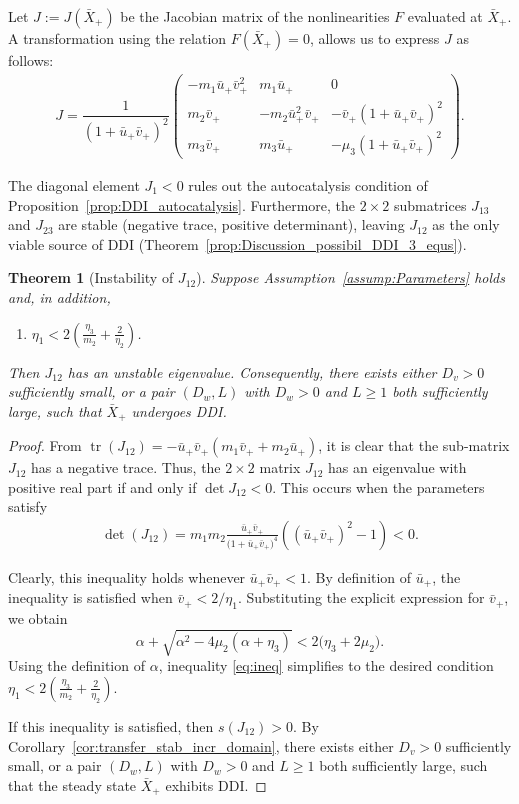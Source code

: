 \documentclass[12pt, a4paper]{amsart}
\numberwithin{equation}{section}
\newcommand{\CSS}{\bar{X}}
\def\me{\mu_3}
\def\be{\begin{equation}}
\def\ee{\end{equation}}
\def\bpm{\begin{pmatrix}}
\def\epm{\end{pmatrix}}
\DeclareMathOperator{\tr}{tr}
\newtheorem{theorem}{\bf Theorem}[section]
\begin{document}
Let $J := J(\CSS_+)$ be the Jacobian matrix of the nonlinearities $F$ evaluated at $\CSS_+$. A transformation using the relation $F(\CSS_+) = 0$, allows us to express $J$ as follows:
\begin{align}    
J 
= \dfrac{1}{(1 + \bar u_+ \bar v_+)^2} \bpm -m_1 \bar u_+ \bar v_+^2 & m_1 \bar u_+  & 0 \\ m_2 \bar v_+ & -m_2 \bar u_+ ^2 \bar v_+ & -\bar v_+ (1 + \bar u_+ \bar v_+)^2 \\ m_3 \bar v_+ & m_3 \bar u_+  & -\me (1 + \bar u_+ \bar v_+)^2 \epm.
\end{align}

The diagonal element $J_1<0$ rules out the autocatalysis condition of Proposition~\ref{prop:DDI_autocatalysis}.
Furthermore, the $2\times 2$ submatrices $J_{13}$ and $J_{23}$ are stable (negative trace, positive determinant), leaving $J_{12}$ as the only viable source of DDI (Theorem~\ref{prop:Discussion_possibil_DDI_3_equs}).

\begin{theorem}[Instability of $J_{12}$]
\label{thm:J12unstable}
Suppose Assumption~\ref{assump:Parameters} holds and, in addition,
\begin{enumerate}
    \item[$(4)$] $\eta_1 < 2\left(\frac{\eta_3}{m_2} + \frac{2}{\eta_2}\right)$.
\end{enumerate}
Then $J_{12}$ has an unstable eigenvalue.
Consequently, there exists either $D_v > 0$ sufficiently small, or a pair $(D_w, L)$ with $D_w > 0$ and $L \geqslant 1$ both sufficiently large, such that $\CSS_+$ undergoes DDI.
\end{theorem}

\begin{proof}
From $\tr (J_{12}) = - \bar u_+ \bar v_+ (m_1 \bar v_+ + m_2 \bar u_+)$, it is clear that the sub-matrix $J_{12}$ has a negative trace. Thus, the $2 \times 2$ matrix $J_{12}$ has an eigenvalue with positive real part if and only if $\det J_{12}<0$. This occurs when the parameters satisfy
\begin{align}
    \det(J_{12}) 
    = m_1 m_2 \frac{\bar u_+ \bar v_+}{\big(1+\bar u_+ \bar v_+\big)^4} 
      \left( (\bar u_+ \bar v_+)^2 - 1 \right) < 0.
\end{align}

Clearly, this inequality holds whenever $\bar u_+ \bar v_+ < 1$.  By definition of $\bar u_+$, the inequality is satisfied when $\bar v_+ < 2 / \eta_1$. Substituting the explicit expression for $\bar v_+$, we obtain
\be
\label{eq:ineq}\alpha + \sqrt{\alpha^2 - 4 \mu_2 (\alpha + \eta_3)} <  2 \bigl( \eta_3 + 2 \mu_2 \bigr).\ee
Using the definition of $\alpha$, inequality \eqref{eq:ineq} simplifies to the desired condition
\mbox{$\eta_1 < 2 ( \frac{\eta_3}{m_2} + \frac{2}{\eta_2})$}.

If this inequality is satisfied, then $s(J_{12}) > 0$.  
By Corollary~\ref{cor:transfer_stab_incr_domain}, there exists either $D_v > 0$ sufficiently small, or a pair $(D_w, L)$ with $D_w > 0$ and $L \geqslant 1$ both sufficiently large, such that the steady state $\CSS_+$ exhibits DDI.
\end{proof}
\end{document}
